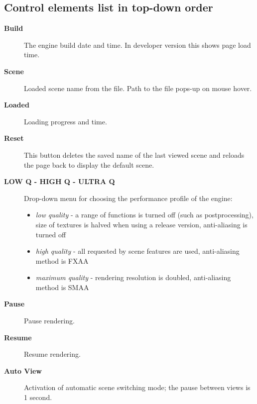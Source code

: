 \documentclass[a4paper,12pt,oneside]{sphinxmanual}
\begin{document}
\begin{DUlineblock}{0em}
\item[] 
\end{DUlineblock}


\subsection{Control elements list in top-down order}
\label{viewer:id4}\begin{description}
\item[{\textbf{Build}}] \leavevmode
The engine build date and time. In developer version this shows page load time.

\item[{\textbf{Scene}}] \leavevmode
Loaded scene name from the  file. Path to the file pops-up on mouse hover.

\item[{\textbf{Loaded}}] \leavevmode
Loading progress and time.

\item[{\textbf{Reset}}] \leavevmode
This button deletes the saved name of the last viewed scene and reloads the page back to display the default scene.

\item[{\textbf{LOW Q - HIGH Q - ULTRA Q}}] \leavevmode
Drop-down menu for choosing the performance profile of the engine:
\begin{itemize}
\item {} 
\emph{low quality} - a range of functions is turned off (such as postprocessing), size of textures is halved when using a release version, anti-aliasing is turned off

\item {} 
\emph{high quality} - all requested by scene features are used, anti-aliasing method is FXAA

\item {} 
\emph{maximum quality} - rendering resolution is doubled, anti-aliasing method is SMAA

\end{itemize}

\item[{\textbf{Pause}}] \leavevmode
Pause rendering.

\item[{\textbf{Resume}}] \leavevmode
Resume rendering.

\item[{\textbf{Auto View}}] \leavevmode
Activation of automatic scene switching mode; the pause between views is 1 second.


\end{description}
\end{document}
